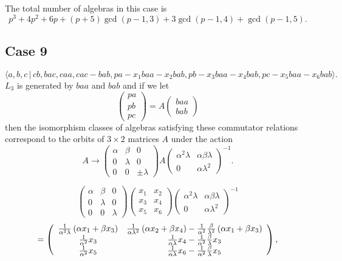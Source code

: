 \documentclass[10pt,thmsa]{article}
\begin{document}
The total number of algebras in this case is 
\[
p^3+4p^2+6p+(p+5)\gcd (p-1,3)+3\gcd (p-1,4)+\gcd (p-1,5). 
\]

\subsection{Case 9}

\[
\langle
a,b,c\,|%
\,cb,bac,caa,cac-bab,pa-x_{1}baa-x_{2}bab,pb-x_{3}baa-x_{4}bab,pc-x_{5}baa-x_{6}bab\rangle . 
\]%
$L_{3}$ is generated by $baa$ and $bab$ and if we let 
\[
\left( 
\begin{array}{l}
pa \\ 
pb \\ 
pc%
\end{array}%
\right) =A\left( 
\begin{array}{l}
baa \\ 
bab%
\end{array}%
\right) 
\]%
then the isomorphism classes of algebras satisfying these commutator
relations correspond to the orbits of $3\times 2$ matrices $A$ under the
action 
\[
A\rightarrow \left( 
\begin{array}{lll}
\alpha & \beta & 0 \\ 
0 & \lambda & 0 \\ 
0 & 0 & \pm \lambda%
\end{array}%
\right) A\left( 
\begin{array}{ll}
\alpha ^{2}\lambda & \alpha \beta \lambda \\ 
0 & \alpha \lambda ^{2}%
\end{array}%
\right) ^{-1}. 
\]

\[
\left( 
\begin{array}{lll}
\alpha & \beta & 0 \\ 
0 & \lambda & 0 \\ 
0 & 0 & \lambda%
\end{array}%
\right) \left( 
\begin{array}{cc}
x_{1} & x_{2} \\ 
x_{3} & x_{4} \\ 
x_{5} & x_{6}%
\end{array}%
\right) \left( 
\begin{array}{ll}
\alpha ^{2}\lambda & \alpha \beta \lambda \\ 
0 & \alpha \lambda ^{2}%
\end{array}%
\right) ^{-1} 
\]
\[
=\left( 
\begin{array}{cc}
\frac{1}{\alpha ^{2}\lambda }\left( \alpha x_{1}+\beta x_{3}\right) & \frac{1%
}{\alpha \lambda ^{2}}\left( \alpha x_{2}+\beta x_{4}\right) -\frac{1}{%
\alpha ^{2}}\frac{\beta }{\lambda ^{2}}\left( \alpha x_{1}+\beta x_{3}\right)
\\ 
\frac{1}{\alpha ^{2}}x_{3} & \frac{1}{\alpha \lambda }x_{4}-\frac{1}{\alpha
^{2}}\frac{\beta }{\lambda }x_{3} \\ 
\frac{1}{\alpha ^{2}}x_{5} & \frac{1}{\alpha \lambda }x_{6}-\frac{1}{\alpha
^{2}}\frac{\beta }{\lambda }x_{5}%
\end{array}%
\right) , 
\]
\end{document}
